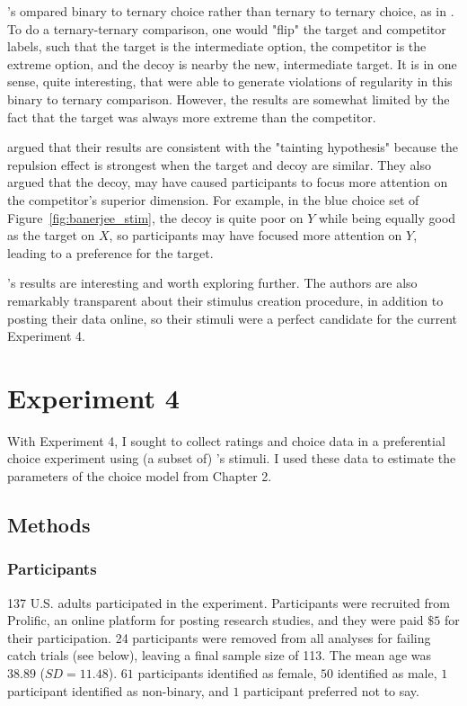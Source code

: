 \textcite{banerjeeFactorsThatPromote2024}'s ompared binary to ternary choice rather than ternary to ternary choice, as in \textcite{spektorWhenGoodLooks2018b}. To do a ternary-ternary comparison, one would "flip" the target and competitor labels, such that the target is the intermediate option, the competitor is the extreme option, and the decoy is nearby the new, intermediate target. It is in one sense, quite interesting, that \textcite{banerjeeFactorsThatPromote2024} were able to generate violations of regularity in this binary to ternary comparison. However, the results are somewhat limited by the fact that the target was always more extreme than the competitor.

\textcite{banerjeeFactorsThatPromote2024} argued that their results are consistent with the "tainting hypothesis" \parencite{simonson2014vices} because the repulsion effect is strongest when the target and decoy are similar. They also argued that the decoy, may have caused participants to focus more attention on the competitor's superior dimension. For example, in the blue choice set of Figure~\ref{fig:banerjee_stim}, the decoy is quite poor on $Y$ while being equally good as the target on $X$, so participants may have focused more attention on $Y$, leading to a preference for the target. 

\textcite{banerjeeFactorsThatPromote2024}'s results are interesting and worth exploring further. The authors are also remarkably transparent about their stimulus creation procedure, in addition to posting their data online, so their stimuli were a perfect candidate for the current Experiment 4.

\section{Experiment 4}

With Experiment 4, I sought to collect ratings and choice data in a preferential choice experiment using (a subset of) \textcite{banerjeeFactorsThatPromote2024}'s stimuli. I used these data to estimate the parameters of the choice model from Chapter 2.

\subsection{Methods}

\subsubsection{Participants}
137 U.S. adults participated in the experiment. Participants were recruited from Prolific, an online platform for posting research studies, and they were paid $\$5$ for their participation. 24 participants were removed from all analyses for failing catch trials (see below), leaving a final sample size of 113. The mean age was $38.89$ ($SD=11.48$). $61$ participants identified as female, $50$ identified as male, $1$ participant identified as non-binary, and $1$ participant preferred not to say.

